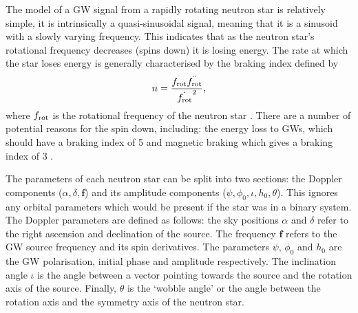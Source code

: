 The model of a \gls{GW} signal from a rapidly rotating neutron star is relatively simple, it is intrinsically a
quasi-sinusoidal signal, meaning that it is a sinusoid with a slowly
varying frequency. This indicates that as the neutron star's rotational frequency decreases (spins down) it is losing energy. The rate at which the star loses energy is generally characterised by the braking index defined by
\begin{equation}
	n = \frac{f_{\rm{rot}} \ddot{f_{\rm{rot}}}}{\dot{f_{\rm{rot}}}^2},
\end{equation}
where $f_{\rm{rot}}$ is the rotational frequency of the neutron star \citep{dearaujo2016GravitationalWaves}.
There are a number of potential reasons for the spin down, including: the energy loss to \glspl{GW}, which should have a braking index of 5 \citep{dearaujo2016GravitationalWaves} and magnetic braking which gives a braking index of 3 \citep{dearaujo2016GravitationalWaves}.

The parameters of each neutron star can be split into two sections: the Doppler components
($\alpha,\delta,{\bm f}$) and its amplitude components ($\psi,\phi_0, \iota,
h_0, \theta$). This ignores any orbital parameters which would be present if the
star was in a binary system. The Doppler parameters are defined as follows: the sky positions
$\alpha$ and $\delta$ refer to the right ascension and declination of the source. The frequency ${\bm f}$ refers to
the \gls{GW} source frequency and its spin derivatives.  The parameters $\psi$,
$\phi_0$ and $h_0 $ are the \gls{GW} polarisation, initial phase and amplitude
respectively.  The inclination angle $\iota$ is the angle between a vector pointing towards the source and the rotation axis of the source. 
Finally, $\theta$ is the `wobble angle' or the angle between the rotation axis and the
symmetry axis of the neutron star.


